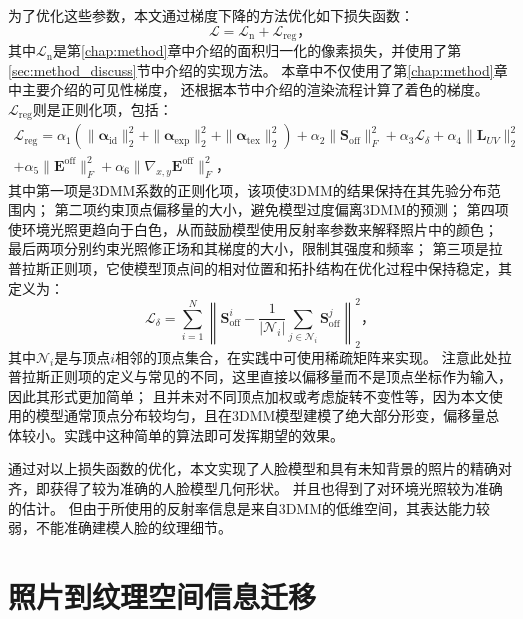 为了优化这些参数，本文通过梯度下降的方法优化如下损失函数：
\begin{equation}
    \mathcal{L} = \mathcal{L}_\mathrm{n} + \mathcal{L}_\mathrm{reg}
    \text{，}
\end{equation}
其中$\mathcal{L}_\mathrm{n}$是第\ref{chap:method}章中介绍的面积归一化的像素损失，并使用了第\ref{sec:method_discuss}节中介绍的实现方法。
本章中不仅使用了第\ref{chap:method}章中主要介绍的可见性梯度，
还根据本节中介绍的渲染流程计算了着色的梯度。
$\mathcal{L}_\mathrm{reg}$则是正则化项，包括：
\begin{equation}
\begin{split}
\mathcal{L}_\mathrm{reg} = \alpha_1\left(\| \mathbf{\alpha}_\mathrm{id} \|_2^2 +
    \| \mathbf{\alpha}_\mathrm{exp} \|_2^2 +
    \| \mathbf{\alpha}_\mathrm{tex} \|_2^2\right) +
    \alpha_2 \| \mathbf{S}_\mathrm{off} \|_F^2 +
    \alpha_3 \mathcal{L}_\delta +
    \alpha_4 \| \mathbf{L}_{UV} \|_2^2 \\
    + \alpha_5 \| \mathbf{E}^\mathrm{off} \|_F^2 +
    \alpha_6 \| \nabla_{x,y} \mathbf{E}^\mathrm{off} \|_F^2
    \text{，}
\end{split}
\end{equation}
其中第一项是3DMM系数的正则化项，该项使3DMM的结果保持在其先验分布范围内；
第二项约束顶点偏移量的大小，避免模型过度偏离3DMM的预测；
第四项使环境光照更趋向于白色，从而鼓励模型使用反射率参数来解释照片中的颜色；
最后两项分别约束光照修正场和其梯度的大小，限制其强度和频率；
第三项是拉普拉斯正则项，它使模型顶点间的相对位置和拓扑结构在优化过程中保持稳定，其定义为：
\begin{equation}
    \mathcal{L}_\delta = \sum_{i=1}^N \left\|\mathbf{S}_\mathrm{off}^i - \frac{1}{|\mathcal{N}_i|}\sum_{j\in\mathcal{N}_i} \mathbf{S}_\mathrm{off}^j\right\|_2^2
    \text{，}
\end{equation}
其中$\mathcal{N}_i$是与顶点$i$相邻的顶点集合，在实践中可使用稀疏矩阵来实现。
注意此处拉普拉斯正则项的定义与常见的不同，这里直接以偏移量而不是顶点坐标作为输入，因此其形式更加简单；
且并未对不同顶点加权或考虑旋转不变性等，因为本文使用的模型通常顶点分布较均匀，且在3DMM模型建模了绝大部分形变，偏移量总体较小。实践中这种简单的算法即可发挥期望的效果。

通过对以上损失函数的优化，本文实现了人脸模型和具有未知背景的照片的精确对齐，即获得了较为准确的人脸模型几何形状。
并且也得到了对环境光照较为准确的估计。
但由于所使用的反射率信息是来自3DMM的低维空间，其表达能力较弱，不能准确建模人脸的纹理细节。

\section{照片到纹理空间信息迁移}
\label{sec:method_photo2tex}

